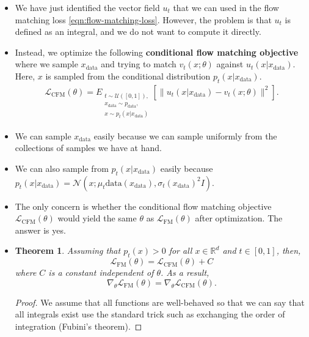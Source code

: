 \documentclass[10pt]{article}
\newtheorem{theorem}[lemma]{Theorem}
\newcommand{\mrm}[1]{\mathrm{#1}}
\newcommand{\mcal}[1]{\mathcal{#1}}
\newcommand{\Real}{\mathbb{R}}
\newcommand{\data}{\mathrm{data}}
\begin{document}
\begin{itemize}
  \item We have just identified the vector field $u_t$ that we can used in the flow matching loss \eqref{eqn:flow-matching-loss}. However, the problem is that $u_t$ is defined as an integral, and we do not want to compute it directly.
  
  \item Instead, we optimize the following {\bf conditional flow matching objective} where we sample $x_{\data}$ and trying to match $v_t(x;\theta)$ against $u_t(x|x_{\data})$. Here, $x$ is sampled from the conditional distribution $p_t(x|x_{\data})$.
  \begin{align*}
    \mcal{L}_{\mrm{CFM}}(\theta) = E_{\substack{t \sim \mcal{U}([0,1]),\\ x_{\data} \sim p_{\data},\\ x \sim p_t(x|x_{\data})}} [ \| u_t(x|x_{\data}) - v_t(x;\theta)\|^2].
  \end{align*}

  \item We can sample $x_{\data}$ easily because we can sample uniformly from the collections of samples we have at hand.
  
  \item We can also sample from $p_t(x|x_{\data})$ easily because $p_t(x|x_{\data}) = \mcal{N}(x; \mu_t{\data}(x_{\data}), \sigma_t(x_{\data})^2I)$.
  
  \item The only concern is whether the conditional flow matching objective $\mcal{L}_{\mrm{CFM}}(\theta)$ would yield the same $\theta$ as $\mcal{L}_{\mrm{FM}}(\theta)$ after optimization. The answer is yes.
  
  \item \begin{theorem}
    Assuming that $p_t(x) > 0$ for all $x \in \Real^d$ and $t \in [0,1]$, then,
    $$\mathcal{L}_{\mrm{FM}}(\theta) = \mcal{L}_{\mrm{CFM}}(\theta) + C$$ where $C$ is a constant independent of $\theta$. As a result, $$\nabla_{\theta} \mathcal{L}_{\mrm{FM}}(\theta) = \nabla_{\theta} \mcal{L}_{\mrm{CFM}}(\theta).$$
  \end{theorem}

  \begin{proof}
    We assume that all functions are well-behaved so that we can say that all integrals exist use the standard trick such as exchanging the order of integration (Fubini's theorem).


\end{proof}
\end{itemize}
\end{document}
